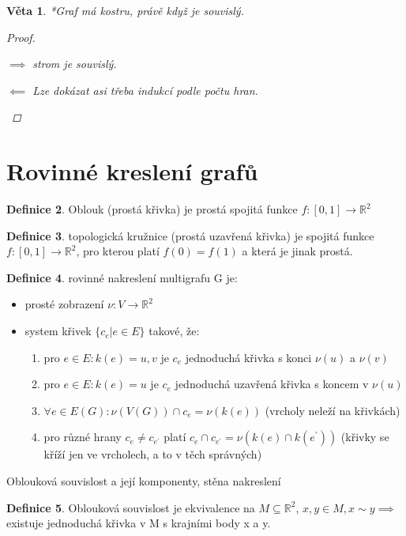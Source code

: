 \documentclass[10pt,a4paper]{article}
\theoremstyle{plain}
\newtheorem{veta}{Věta}
\theoremstyle{definition}
\newtheorem{definice}[veta]{Definice}
\begin{document}
\begin{veta}
*Graf má kostru, právě když je souvislý.
\begin{proof}\begin{itemize}
$\implies$ strom je souvislý.

$\impliedby$ Lze dokázat asi třeba indukcí podle počtu hran. 
\end{itemize}
\end{proof}
\end{veta}


\section{Rovinné kreslení grafů}

\begin{definice}
Oblouk (prostá křivka) je prostá spojitá funkce $f: [0,1] \to \mathbb{R}^2$
\end{definice}

\begin{definice}
topologická kružnice (prostá uzavřená křivka) je spojitá funkce $f: [0,1] \to \mathbb{R}^2$, pro kterou platí $f(0) = f(1)$ a která je jinak prostá.
\end{definice}

\begin{definice}
rovinné nakreslení multigrafu G je:
\begin{itemize}
\item prosté zobrazení $\nu: V \to \mathbb{R}^2$
\item system křivek $\{c_e| e \in E\}$ takové, že: \begin{enumerate}
\item pro $e \in E: k(e) = {u,v} $ je $c_e$ jednoduchá křivka s konci $\nu(u)$ a $\nu(v)$
\item pro $e \in E: k(e) = {u} $ je $c_e$ jednoduchá uzavřená křivka  s koncem v $\nu(u)$
\item $\forall e\in E(G): \nu(V(G)) \cap c_e = \nu(k(e))$ (vrcholy neleží na křivkách)
\item pro různé hrany $c_e \neq c_{e^\prime}$ platí $c_e \cap c_{e^\prime} = \nu(k(e) \cap k(e^\prime))$ (křivky se kříží jen ve vrcholech, a to v těch správných)
\end{enumerate}
\end{itemize}
\end{definice}


Oblouková souvislost a její komponenty, stěna nakreslení

\begin{definice}
Oblouková souvislost je ekvivalence na $M \subseteq \mathbb{R}^2$, $x,y \in M, x \sim y \implies$ existuje jednoduchá křivka v M s krajními body x a y.
\end{definice}
\end{document}
